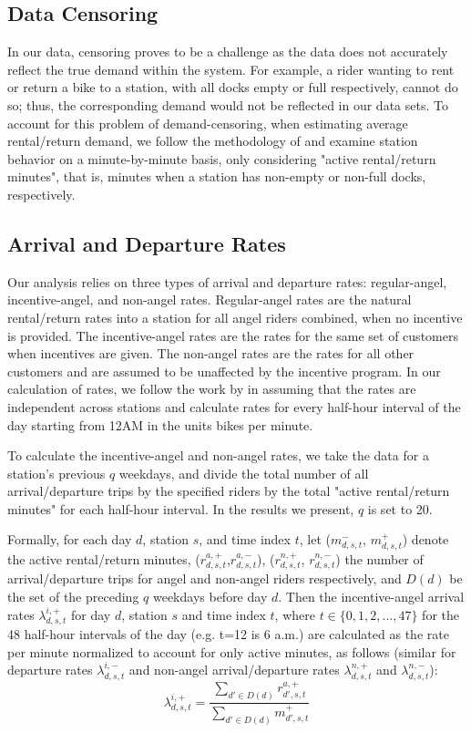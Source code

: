 \subsection{Data Censoring}

In our data, censoring proves to be a challenge as the data does not accurately reflect the true demand within the system. For example, a rider wanting to rent or return a bike to a station, with all docks empty or full respectively, cannot do so; thus, the corresponding demand would not be reflected in our data sets. To account for this problem of demand-censoring, when estimating average rental/return demand, we follow the methodology of \cite{o2015data} and examine station behavior on a minute-by-minute basis, only considering "active rental/return minutes", that is, minutes when a station has non-empty or non-full docks, respectively.

\subsection{Arrival and Departure Rates} 

Our analysis relies on three types of arrival and departure rates: regular-angel, incentive-angel, and non-angel rates. Regular-angel rates are the natural rental/return rates into a station for all angel riders combined, when no incentive is provided. The incentive-angel rates are the rates for the same set of customers when incentives are given. The non-angel rates are the rates for all other customers and are assumed to be unaffected by the incentive program. In our calculation of rates, we follow the work by \cite{o2015data} in assuming that the rates are independent across stations and calculate rates for every half-hour interval of the day starting from 12AM in the units bikes per minute.

To calculate the incentive-angel and non-angel rates, we take the data for a station's previous $q$ weekdays, and divide the total number of all arrival/departure trips by the specified riders by the total "active rental/return minutes" for each half-hour interval. In the results we present, $q$ is set to 20.

Formally, for each day $d$, station $s$, and time index $t$, let ($m_{d, s, t}^-$, $m_{d, s, t}^+$)  denote the active rental/return minutes, ($r_{d,s,t}^{a, +}$,$r_{d,s,t}^{a, -}$), ($r_{d,s,t}^{n, +}$, $r_{d,s,t}^{n, -}$) the number of arrival/departure trips for angel and non-angel riders respectively, and $D(d)$ be the set of the preceding $q$ weekdays before day $d$. Then the incentive-angel arrival rates $\lambda_{d, s, t}^{i, +}$ for day $d$, station $s$ and time index $t$, where $t \in \{0, 1, 2, ..., 47\}$ for the 48 half-hour intervals of the day (e.g. t=12 is 6 a.m.) are calculated as the rate per minute normalized to account for only active minutes, as follows (similar for departure rates $\lambda_{d, s, t}^{i, -}$ and non-angel arrival/departure rates $\lambda_{d, s, t}^{n, +}$ and $\lambda_{d, s, t}^{n, -}$):
\begin{equation}
\lambda_{d, s, t}^{i, +} =   \frac{\sum_{d' \in D(d)} r_{d',s,t}^{a, +}}{\sum_{d' \in D(d)} m_{d',s,t}^+} 
\end{equation}

